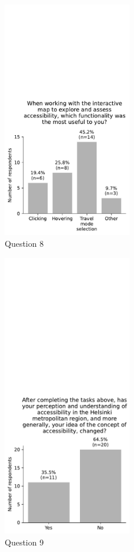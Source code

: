 \begin{figure}[H]
	\centering
	\includegraphics[width=0.5\textwidth]{visual/figures/survey/7.pdf}
	\caption{Question 8}
	\label{fig:q 8}
\end{figure}

\begin{figure}[H]
	\centering
	\includegraphics[width=0.5\textwidth]{visual/figures/survey/8.pdf}
	\caption{Question 9}
	\label{fig:q 9}
\end{figure}

